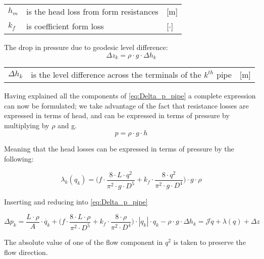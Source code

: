 \begin{center}
	\begin{tabular}{l p{8cm} l}
		$h_{m}$ & is the head loss from form resistances & [\si{m}]\\
		$k_{f}$ &  is coefficient form loss & [$\cdot$]\\
	\end{tabular}
\end{center}

The drop in pressure due to geodesic level difference:
\begin{equation}
	\Delta{z_{k}} = \rho \cdot g \cdot \Delta{h_{k}}
\end{equation}

\begin{center}
	\begin{tabular}{l p{8cm} l}
		$\Delta{h_{k}}$ &  is the level difference across the terminals of the $k^{th}$ pipe & [\si{m}]\\
	\end{tabular}
\end{center}

Having explained all the components of \eqref{eq:Delta_p_pipe} a complete expression can now be formulated; we take advantage of the fact that resistance losses are expressed in terms of head, and can be expressed in terms of pressure by multiplying by $\rho$ and g. \begin{equation}
	p = \rho \cdot g \cdot h  
\end{equation}

Meaning that the head losses can be expressed in terms of pressure by the following:

\begin{equation}
\lambda_{k}(q_{k})  =	\Big(f \cdot \frac{8\cdot L\cdot q^{2}}{\pi^{2}\cdot g \cdot D^{5}} + k_{f}\cdot \frac{8\cdot q^{2}}{\pi^{2}\cdot g \cdot D^{4}}\Big)\cdot g \cdot \rho
\end{equation}

Inserting and reducing into \cref{eq:Delta_p_pipe}

\begin{equation}
	\Delta{p_{k}} = \frac{L\cdot \rho}{A}\cdot \dot{q_{k}}
	+\Big(f \cdot \frac{8\cdot L\cdot \rho}{\pi^{2} \cdot D^{5}} + k_{f}\cdot \frac{8\cdot \rho}{\pi^{2} \cdot D^{4}}\Big)\cdot |q_{k}|\cdot q_{k} 
	- \rho \cdot g \cdot \Delta{h_{k}} = \mathcal{J}\dot{q} + \lambda(q) + \Delta z
\end{equation}

The absolute value of one of the flow component in $q^{2}$ is taken to preserve the flow direction.


